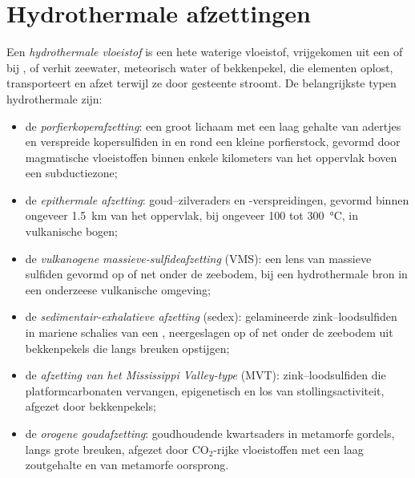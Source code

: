 \section{Hydrothermale afzettingen}\label{sec:b2:ore-deposits:hydrothermal}

\begin{definition}\label{def:b2:ore-deposits:hydrothermal}
Een \emph{hydrothermale vloeistof} is een hete waterige vloeistof, vrijgekomen uit een 
of bij , of verhit zeewater, meteorisch water of bekkenpekel, die elementen oplost,
transporteert en afzet terwijl ze door gesteente stroomt. De belangrijkste typen hydrothermale 
zijn:
\begin{itemize}
  \item de \emph{porfierkoperafzetting}: een groot lichaam met een laag gehalte
        van adertjes en verspreide kopersulfiden in en rond een kleine porfierstock, gevormd door
        magmatische vloeistoffen binnen enkele kilometers van het oppervlak boven een subductiezone;
  \item de \emph{epithermale afzetting}: goud--zilveraders en
        -verspreidingen, gevormd binnen ongeveer \qty{1.5}{km} van het oppervlak, bij ongeveer 100 tot
        \qty{300}{\celsius}, in vulkanische bogen;
  \item de \emph{vulkanogene massieve-sulfideafzetting}
        (VMS): een lens van massieve sulfiden gevormd op of net onder de zeebodem, bij een hydrothermale
        bron in een onderzeese vulkanische omgeving;
  \item de \emph{sedimentair-exhalatieve afzetting} (sedex):
        gelamineerde zink--loodsulfiden in mariene schalies van een , neergeslagen op of net
        onder de zeebodem uit bekkenpekels die langs breuken opstijgen;
  \item de \emph{afzetting van het Mississippi Valley-type} (MVT):
        zink--loodsulfiden die platformcarbonaten vervangen, epigenetisch en los van
        stollingsactiviteit, afgezet door bekkenpekels;
  \item de \emph{orogene goudafzetting}: goudhoudende kwartsaders in
        metamorfe gordels, langs grote breuken, afgezet door CO$_2$-rijke vloeistoffen met een laag zoutgehalte en van
        metamorfe oorsprong.
\end{itemize}
\end{definition}

